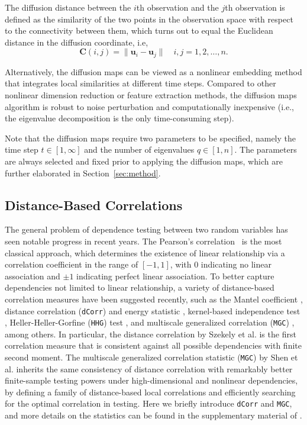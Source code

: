 \documentclass[11pt]{article}
\theoremstyle{definition}
\begin{document}
The diffusion distance between the $i$th observation and the $j$th observation is defined as the similarity of the two points in the observation space with respect to the connectivity between them, which turns out to equal the Euclidean distance in the diffusion coordinate, i.e,
\begin{equation}
\label{eq:diffusion}
\mathbf{C}(i,j)  =   \| \mathbf{u}_i - \mathbf{u}_j \|   \quad i,j = 1,2, \ldots , n.
\end{equation}

Alternatively, the diffusion maps can be viewed as a nonlinear embedding method that integrates local similarities at different time steps. Compared to other nonlinear dimension reduction or feature extraction methods, the diffusion maps algorithm is robust to noise perturbation and computationally inexpensive (i.e., the eigenvalue decomposition is the only time-consuming step). 

Note that the diffusion maps require two parameters to be specified, namely the time step $t \in [1,\infty]$ and the number of eigenvalues $q \in [1,n]$. The parameters are always selected and fixed prior to applying the diffusion maps, which are further elaborated in Section~\ref{sec:method}. 

\subsection{Distance-Based Correlations}
\label{ssec:method1}

The general problem of dependence testing between two random variables has seen notable progress in recent years. The Pearson's correlation~\cite{Pearson1895} is the most classical approach, which determines the existence of linear relationship via a correlation coefficient in the range of $[-1,1]$, with $0$ indicating no linear association and $\pm 1$ indicating perfect linear association. To better capture dependencies not limited to linear relationship, a variety of distance-based correlation measures have been suggested recently, such as the Mantel coefficient \cite{mantel1967}, distance correlation (\texttt{dCorr}) and energy statistic \cite{szekely2007measuring,szekelyRizzo2013a, RizzoSzekely2016}, kernel-based independence test \cite{GrettonGyorfi2010}, Heller-Heller-Gorfine (\texttt{HHG}) test \cite{HellerGorfine2013,heller2016consistent}, and multiscale generalized correlation (\texttt{MGC}) \cite{shen2016discovering}, among others. In particular, the distance correlation by Szekely et al. \cite{szekely2007measuring} is the first correlation measure that is consistent against all possible dependencies with finite second moment. The multiscale generalized correlation statistic (\texttt{MGC}) by Shen et al. \cite{shen2016discovering} inherits the same consistency of distance correlation with remarkably better finite-sample testing powers under high-dimensional and nonlinear dependencies, by defining a family of distance-based local correlations and efficiently searching for the optimal correlation in testing. Here we briefly introduce \texttt{dCorr} and \texttt{MGC}, and more details on the statistics can be found in the supplementary material of \cite{shen2016discovering}. 
\end{document}
